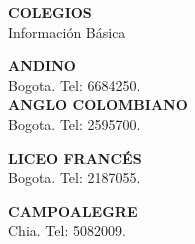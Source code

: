 \documentclass[letterpaper, 12pt]{book}\usepackage[]{graphicx}\usepackage[]{color}
\begin{document}

\AddToShipoutPicture{\BackgroundPic}

\makeeccoletitle

\begin{center}
{\bf\Huge{COLEGIOS}}\\
\vspace{0.1cm}
 Información Básica
\end{center}

\vspace{6cm}
\begin{center}
{\bf\Large{ANDINO}}\\
\vspace{0.1cm}
Bogota. Tel: 6684250.\\

\vspace{1cm}
{\bf\Large{ANGLO COLOMBIANO}}\\
\vspace{0.1cm}
Bogota. Tel: 2595700.

\vspace{1cm}
{\bf\Large{LICEO FRANCÉS}}\\
\vspace{0.1cm}
Bogota. Tel: 2187055.

\vspace{1cm}
{\bf\Large{CAMPOALEGRE}}\\
\vspace{0.1cm}
Chia. Tel: 5082009.
\end{center}
\end{document}
